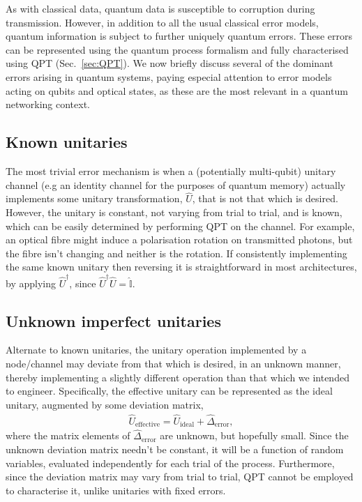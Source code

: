 \documentclass[aps, rmp, twocolumn, amsmath, amssymb, nofootinbib, superscriptaddress, longbibliography, floatfix, table-of-contents, eqsecnum]{revtex4-1}
\begin{document}
As with classical data, quantum data is susceptible to corruption during transmission. However, in addition to all the usual classical error models, quantum information is subject to further uniquely quantum errors. These errors can be represented using the quantum process formalism and fully characterised using QPT (Sec.~\ref{sec:QPT}). We now briefly discuss several of the dominant errors arising in quantum systems, paying especial attention to error models acting on qubits and optical states, as these are the most relevant in a quantum networking context.

%
%

\subsection{Known unitaries} 

The most trivial error mechanism is when a (potentially multi-qubit) unitary channel (e.g an identity channel for the purposes of quantum memory) actually implements some unitary transformation, $\hat{U}$, that is not that which is desired. However, the unitary is constant, not varying from trial to trial, and is known, which can be easily determined by performing QPT on the channel. For example, an optical fibre might induce a polarisation rotation on transmitted photons, but the fibre isn't changing and neither is the rotation. If consistently implementing the same known unitary then reversing it is straightforward in most architectures, by applying $\hat{U}^\dag$, since $\hat{U}^\dag\hat{U}=\hat{\mathbb{I}}$.

%
%

\subsection{Unknown imperfect unitaries} 

Alternate to known unitaries, the unitary operation implemented by a node/channel may deviate from that which is desired, in an unknown manner, thereby implementing a slightly different operation than that which we intended to engineer. Specifically, the effective unitary can be represented as the ideal unitary, augmented by some deviation matrix,
\begin{align}
	\hat{U}_\text{effective} = \hat{U}_\text{ideal} + \hat{\Delta}_\text{error},
\end{align}
where the matrix elements of $\hat{\Delta}_\text{error}$ are unknown, but hopefully small. Since the unknown deviation matrix needn't be constant, it will be a function of random variables, evaluated independently for each trial of the process. Furthermore, since the deviation matrix may vary from trial to trial, QPT cannot be employed to characterise it, unlike unitaries with fixed errors.
\end{document}
